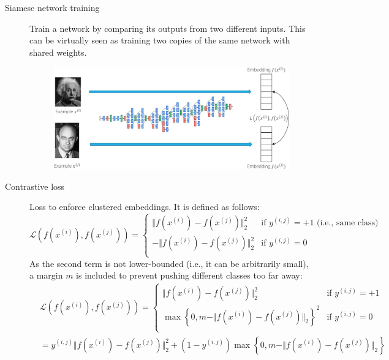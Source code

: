 \begin{description}
    \item[Siamese network training] 
        Train a network by comparing its outputs from two different inputs. This can be virtually seen as training two copies of the same network with shared weights.

        \begin{figure}[H]
            \centering
            \includegraphics[width=0.7\linewidth]{./img/_siamese_network.jpg}
        \end{figure}

        \item[Contrastive loss] 
            Loss to enforce clustered embeddings. It is defined as follows:
            \[
                \mathcal{L}\left( f(x^{(i)}), f(x^{(j)}) \right) = 
                \begin{cases}
                    \Vert f(x^{(i)}) - f(x^{(j)}) \Vert_2^2 & \text{if $y^{(i, j)} = +1$ (i.e., same class)} \\
                    - \Vert f(x^{(i)}) - f(x^{(j)}) \Vert_2^2 & \text{if $y^{(i, j)} = 0$} \\
                \end{cases}
            \]
            As the second term is not lower-bounded (i.e., it can be arbitrarily small), a margin $m$ is included to prevent pushing different classes too far away:
            \[
                \begin{split}
                    &\mathcal{L}\left( f(x^{(i)}), f(x^{(j)}) \right) = 
                    \begin{cases}
                        \Vert f(x^{(i)}) - f(x^{(j)}) \Vert_2^2 & \text{if $y^{(i, j)} = +1$} \\
                        \max\left\{0, m - \Vert f(x^{(i)}) - f(x^{(j)}) \Vert_2\right\}^2 & \text{if $y^{(i, j)} = 0$} \\
                    \end{cases} \\
                    &= y^{(i, j)} \Vert f(x^{(i)}) - f(x^{(j)}) \Vert_2^2 + (1-y^{(i, j)}) \max\left\{0, m - \Vert f(x^{(i)}) - f(x^{(j)}) \Vert_2\right\}
                \end{split}
            \]


\end{description}
